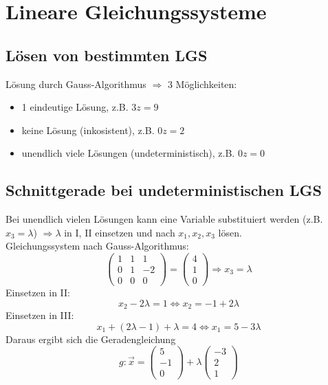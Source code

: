 
\section{Lineare Gleichungssysteme}
\label{sec:lineare_gleichungssysteme}

\subsection{Lösen von bestimmten LGS}
\label{sub:lösen_von_bestimmten_lgs}

Lösung durch Gauss-Algorithmus $\Rightarrow$ 3 Möglichkeiten:

\begin{itemize}
	\item 1 eindeutige Lösung, z.B. $3z = 9$
	\item keine Lösung (inkosistent), z.B. $0z = 2$
	\item unendlich viele Lösungen (undeterministisch), z.B. $0z = 0$
\end{itemize}

\subsection{Schnittgerade bei undeterministischen LGS}
\label{sub:schnittgerade_bei_undeterministischen_lgs}

Bei unendlich vielen Lösungen kann eine Variable substituiert werden (z.B. $x_3 = \lambda$) $\Rightarrow \lambda$ 
in I, II einsetzen und nach $x_1, x_2, x_3$ lösen.\\
Gleichungssystem nach Gauss-Algorithmus:
\begin{displaymath}
	\left(\begin{matrix}
		1 & 1 & 1 \\ 0 & 1 & -2 \\ 0 & 0 & 0
	\end{matrix}\right)	
	= \left(\begin{matrix}
		4 \\ 1 \\ 0
	\end{matrix}\right) \Rightarrow x_3 = \lambda
\end{displaymath}
Einsetzen in II:
\begin{displaymath} x_2 - 2 \lambda = 1 \Leftrightarrow x_2 = -1 + 2 \lambda \end{displaymath}
Einsetzen in III:
\begin{displaymath} x_1 + (2\lambda -1) + \lambda = 4 \Leftrightarrow x_1 = 5 - 3\lambda \end{displaymath}
Daraus ergibt sich die Geradengleichung
\begin{displaymath}
	g: \overrightarrow{x} = \left(\begin{matrix}5\\-1\\0\end{matrix}\right) + \lambda
	\left(\begin{matrix}-3\\2\\1\end{matrix}\right)
\end{displaymath}

